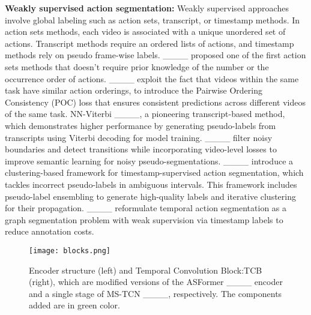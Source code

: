 \textbf{Weakly supervised action segmentation:} Weakly supervised approaches involve global labeling such as action sets, transcript, or timestamp methods. In action sets methods,  each video is associated with a unique unordered set of actions.  Transcript methods require an ordered lists of actions, and  timestamp methods rely on pseudo frame-wise labels. ____ proposed one of the first action sets methods that doesn't require prior knowledge of the number or the occurrence order of actions. ____ exploit the fact that videos within the same task have similar action orderings, to introduce the Pairwise Ordering Consistency (POC) loss that ensures consistent predictions across different videos of the same task. NN-Viterbi ____, a pioneering transcript-based method, which demonstrates higher performance by generating pseudo-labels from transcripts using Viterbi decoding for model training. ____  filter noisy boundaries and detect transitions while incorporating video-level losses to improve semantic learning for noisy pseudo-segmentations. ____ introduce a clustering-based framework for timestamp-supervised action segmentation, which tackles incorrect pseudo-labels in ambiguous intervals. This framework includes pseudo-label ensembling to generate high-quality labels and iterative clustering for their propagation. ____ reformulate temporal action segmentation as a graph segmentation problem with weak supervision via timestamp labels to reduce annotation costs.


\begin{figure}
\centering
\texttt{[image: blocks.png]}
\caption{Encoder structure (left) and Temporal Convolution Block:TCB (right), which are modified versions of the ASFormer ____ encoder and a single stage of MS-TCN ____, respectively. The components added are in green color. }
\label{fig:comp} 
\end{figure}